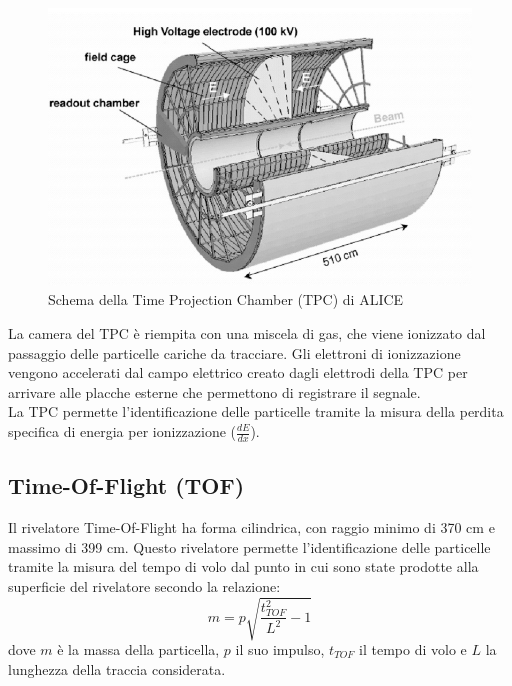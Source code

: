      \begin{figure}[htbp]
        \centering
        \includegraphics[width=0.7\linewidth]{ALICE/ALICE-TPC-detector.png}
        \caption{Schema della Time Projection Chamber (TPC) di ALICE}
        \label{fig:TPCcomplex}
    \end{figure}
    
    La camera del TPC è riempita con una miscela di gas, che viene ionizzato dal passaggio delle particelle cariche da tracciare. Gli elettroni di ionizzazione vengono accelerati dal campo elettrico creato dagli elettrodi della TPC per arrivare alle placche esterne che permettono di registrare il segnale.
    \\La TPC permette l'identificazione delle particelle tramite la misura della perdita specifica di energia per ionizzazione ($\frac{dE}{dx}$). 
    

    \subsection{Time-Of-Flight (TOF)} \label{TOF}
    Il rivelatore Time-Of-Flight ha forma cilindrica, con raggio minimo di 370 cm e massimo di 399 cm. Questo rivelatore permette l'identificazione delle particelle tramite la misura del tempo di volo dal punto in cui sono state prodotte alla superficie del rivelatore secondo la relazione:
        \begin{equation}
            m = p\sqrt{\frac{t^2_{TOF}}{L^2}-1}
        \end{equation}
    dove $m$ è la massa della particella, $p$ il suo impulso, $t_{TOF}$ il tempo di volo e $L$ la lunghezza della traccia considerata.
    